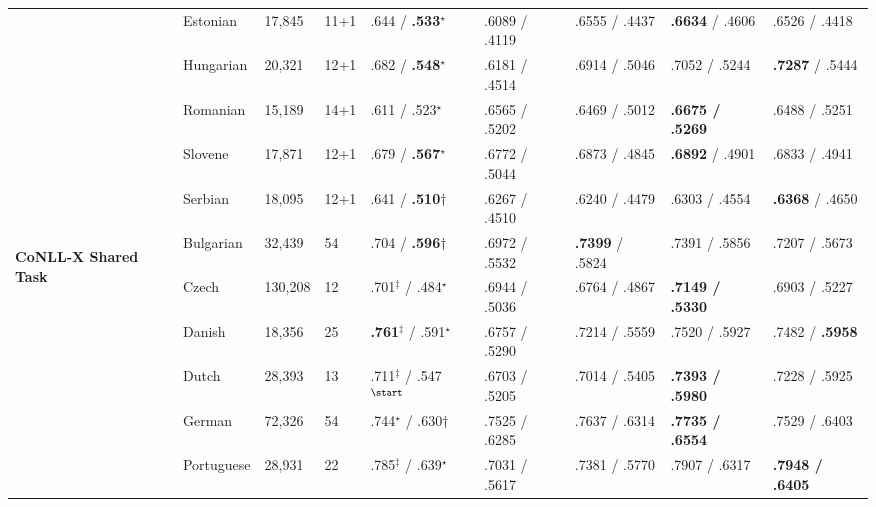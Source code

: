 \begin{table}[ht]
\begin{flushleft}
\begin{tabular}{|@{ }l@{ }|@{ }l@{ }|@{ }l@{ }|@{ }l@{ }|@{ }l@{ }|@{ }l@{ }|@{ }l@{ }|@{ }l@{ }|@{ }l@{ }|}
        & Estonian   & 17,845  & 11+1 & .644 / \textbf{.533}$^\star$    & .6089 / .4119 & .6555 / .4437 & \textbf{.6634} / .4606     & .6526 / .4418 \\
        & Hungarian  & 20,321  & 12+1 & .682 / \textbf{.548}$^\star$    & .6181 / .4514 & .6914 / .5046 & .7052 / .5244     & \textbf{.7287} / .5444 \\
        & Romanian   & 15,189  & 14+1 & .611 / .523$^\star$    & .6565 / .5202 & .6469 / .5012 & \textbf{.6675 / .5269}     & .6488 / .5251 \\
        & Slovene    & 17,871  & 12+1 & .679 / \textbf{.567}$^\star$    & .6772 / .5044 & .6873 / .4845 & \textbf{.6892} / .4901     & .6833 / .4941 \\
        & Serbian    & 18,095  & 12+1 & .641 / \textbf{.510}$\dagger$        & .6267 / .4510 & .6240 / .4479 & .6303 / .4554     & \textbf{.6368} / .4650 \\
        \hline %
        \multirow{10}{*}{\begin{sideways}\textbf{CoNLL-X Shared Task}\end{sideways}}
        & Bulgarian  & 32,439  & 54   & .704 / \textbf{.596}$\dagger$        & .6972 / .5532 & \textbf{.7399} / .5824  & .7391 / .5856     & .7207 / .5673 \\
        & Czech      & 130,208 & 12   & .701$^\ddagger$ / .484$^\star$           & .6944 / .5036 & .6764 / .4867  & \textbf{.7149 / .5330}     & .6903 / .5227 \\
        & Danish     & 18,356  & 25   & \textbf{.761}$^\ddagger$ / .591$^\star$           & .6757 / .5290 & .7214 / .5559  & .7520 / .5927     & .7482 / \textbf{.5958} \\
        & Dutch      & 28,393  & 13   & .711$^\ddagger$ / .547$^\start$ & .6703 / .5205 & .7014 / .5405  & \textbf{.7393 / .5980}     & .7228 / .5925 \\
        & German     & 72,326  & 54   & .744$^\star$ / .630$\dagger$& .7525 / .6285 & .7637 / .6314  & \textbf{.7735 / .6554}     & .7529 / .6403 \\
        & Portuguese & 28,931  & 22   & .785$^\ddagger$ / .639$^\star$           & .7031 / .5617 & .7381 / .5770  & .7907 / .6317     & \textbf{.7948 / .6405} \\

\end{tabular}
\end{flushleft}
\end{table}
